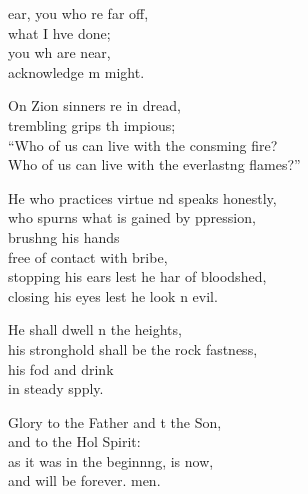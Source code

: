 \settowidth{\versewidth}{Who of us can live with the everlasting flames?”}
\begin{psalmverse}%
  \begin{patverse}
ear, you who re far off,\Med\\
what I hve done;\\
you wh are near,\Med\\
acknowledge m might.

On Zion sinners re in dread,\Med\\
trembling grips th impious;\\
“Who of us can live with the consming fire?\Med\\
Who of us can live with the everlast\pointup{\i}ng flames?”

He who practices virtue nd speaks honestly,\Med\\
who spurns what is gained by ppression,\\
brush\pointup{\i}ng his hands\Med\\
free of contact with  bribe,\\
stopping his ears lest he har of bloodshed,\Med\\
closing his eyes lest he look n evil.

He shall dwell n the heights,\Med\\
his stronghold shall be the rock fastness,\\
his fod and drink\Med\\
in steady spply.

Glory to the Father and t the Son,\Med\\
and to the Hol Spirit:\\
as it was in the beginn\pointup{\i}ng, is now,\Med\\
and will be forever. men. 
  \end{patverse}
\end{psalmverse}
